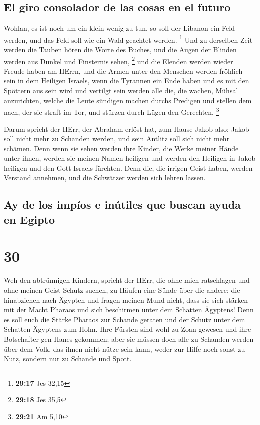 \hypertarget{el-giro-consolador-de-las-cosas-en-el-futuro}{%
\subsection{El giro consolador de las cosas en el
futuro}\label{el-giro-consolador-de-las-cosas-en-el-futuro}}

 Wohlan, es ist noch um ein klein wenig zu tun, so soll
der Libanon ein Feld werden, und das Feld soll wie ein Wald geachtet
werden. \footnote{\textbf{29:17} Jes 32,15}  Und zu
derselben Zeit werden die Tauben hören die Worte des Buches, und die
Augen der Blinden werden aus Dunkel und Finsternis sehen, \footnote{\textbf{29:18}
  Jes 35,5}  und die Elenden werden wieder Freude haben
am HErrn, und die Armen unter den Menschen werden fröhlich sein in dem
Heiligen Israels,  wenn die Tyrannen ein Ende haben und
es mit den Spöttern aus sein wird und vertilgt sein werden alle die, die
wachen, Mühsal anzurichten,  welche die Leute sündigen
machen durchs Predigen und stellen dem nach, der sie straft im Tor, und
stürzen durch Lügen den Gerechten. \footnote{\textbf{29:21} Am 5,10}

 Darum spricht der HErr, der Abraham erlöst hat, zum
Hause Jakob also: Jakob soll nicht mehr zu Schanden werden, und sein
Antlitz soll sich nicht mehr schämen.  Denn wenn sie
sehen werden ihre Kinder, die Werke meiner Hände unter ihnen, werden sie
meinen Namen heiligen und werden den Heiligen in Jakob heiligen und den
Gott Israels fürchten.  Denn die, die irrigen Geist
haben, werden Verstand annehmen, und die Schwätzer werden sich lehren
lassen.

\hypertarget{ay-de-los-impuxedos-e-inuxfatiles-que-buscan-ayuda-en-egipto}{%
\subsection{Ay de los impíos e inútiles que buscan ayuda en
Egipto}\label{ay-de-los-impuxedos-e-inuxfatiles-que-buscan-ayuda-en-egipto}}

\hypertarget{section-29}{%
\section{30}\label{section-29}}

 Weh den abtrünnigen Kindern, spricht der HErr, die ohne
mich ratschlagen und ohne meinen Geist Schutz suchen, zu Häufen eine
Sünde über die andere;  die hinabziehen nach Ägypten und
fragen meinen Mund nicht, dass sie sich stärken mit der Macht Pharaos
und sich beschirmen unter dem Schatten Ägyptens!  Denn es
soll euch die Stärke Pharaos zur Schande geraten und der Schutz unter
dem Schatten Ägyptens zum Hohn.  Ihre Fürsten sind wohl zu
Zoan gewesen und ihre Botschafter gen Hanes gekommen; 
aber sie müssen doch alle zu Schanden werden über dem Volk, das ihnen
nicht nütze sein kann, weder zur Hilfe noch sonst zu Nutz, sondern nur
zu Schande und Spott.

